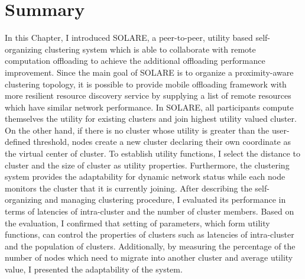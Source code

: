\section{Summary}
\label{solare:summary}
In this Chapter, I introduced SOLARE, a peer-to-peer, utility based
self-organizing clustering system which is able to collaborate with
remote computation offloading to achieve the additional offloading
performance improvement.
%
Since the main goal of SOLARE is to organize a proximity-aware
clustering topology, it is possible to provide mobile offloading
framework with more resilient resource discovery service by supplying a
list of remote resources which have similar network performance. 
%
In SOLARE, all participants compute themselves the utility for existing clusters
and join highest utility valued cluster.
%
On the other hand, if there is no cluster whose utility is greater than
the user-defined threshold, nodes create a new cluster declaring their
own coordinate as the virtual center of cluster.
%
To establish utility functions, I select the distance to cluster and the
size of cluster as utility properties.
%
Furthermore, the clustering system provides the adaptability for dynamic
network status while each node monitors the cluster that it is currently
joining.
%
After describing the self-organizing and managing clustering procedure,
I evaluated its performance in terms of latencies of intra-cluster and
the number of cluster members.
%
Based on the evaluation, I confirmed that setting of parameters, which
form utility functions, can control the properties of clusters such as
latencies of intra-cluster and the population of clusters.
%
Additionally, by measuring the percentage of the number of nodes which
need to migrate into another cluster and average utility value, I
presented the adaptability of the system.
%
